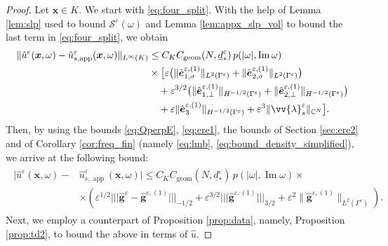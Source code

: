 \documentclass[]{article}
\numberwithin{equation}{section}
\numberwithin{theorem}{section}
\numberwithin{lemma}{section}
\numberwithin{corollary}{section}
\numberwithin{proposition}{section}
\numberwithin{definition}{section}
\newcommand{\re}{\varepsilon}
\renewcommand{\vec}{\boldsymbol}
\renewcommand{\Im}{\operatorname{Im}}
\newcommand{\trinorm}[1]{\vert\!\vert\!\vert #1 \vert\!\vert\!\vert}
\begin{document}
	\begin{proof}
		Let $\vec{x}\in K$. 
		We start with \eqref{eq:four_split}. With the help of Lemma \ref{lem:slp} used to bound $\mathcal{S}^{\re}(\omega)$ and Lemma \ref{lem:appx_slp_vol} to bound the last term in  \eqref{eq:four_split}, we obtain
		\begin{align*}%
			\|\hat{u}^{\re}(\vec{x},\omega) - \hat{u}^{\re}_{s, \operatorname{app}}(\vec{x},\omega)\|_{L^{\infty}(K)} &\leq 
			C_K C_{\operatorname{geom}}(N, \underline{d}_*^{\re}) \, p(|\omega|, \Im \omega)  \\
			&\times\big[ \re\big( \|\hat{\vec{e}}^{\re,(1)}_{1,\sigma}\|_{L^2(\Gamma^{\re})} + \|\hat{\vec{e}}^{\re,(1)}_{2,\sigma}\|_{L^2(\Gamma^{\re})} \big) \\
			&\quad + \re^{3/2} \big( \|\hat{\vec{e}}^{\re,(1)}_{1,\perp}\|_{H^{-1/2}(\Gamma^{\re})} + \|\hat{\vec{e}}^{\re,(1)}_{2,\perp}\|_{H^{-1/2}(\Gamma^{\re})} \big) \\
			&\quad + \re \|\hat{\vec{e}}^{\re,(1)}_3\|_{H^{-1/2}(\Gamma^{\re})} + \re^3 \| \vv{\lambda}^{\re}_s \|_{\mathbb{C}^N} \big].
		\end{align*}
		Then, by using  
		the bounds \eqref{eq:QperpE}, \eqref{eq:ere1}, the bounds of Section \ref{sec:ere2} and of Corollary \ref{cor:freq_fin}  (namely \eqref{eq:lmb}, \eqref{eq:bound_density_simplified}), we arrive at the following bound:
		\begin{align}
			\label{eq:bound_field_s_FD}
			\begin{split}
				|\hat{u}^{\re}(\vec{x},\omega) - &\hat{u}^{\re}_{s, \operatorname{app}}(\vec{x},\omega)| \leq 
				C_KC_{\operatorname{geom}}(N, \underline{d}_*^{\re}) \, p(|\omega|, \Im \omega) \times    \\
				&\times \left(\re^{1/2}\trinorm {\hat{\vec{g}}^{\re}-\hat{\vec{g}}^{\re,(1)}}_{-1/2}+\re^{3/2}\trinorm {\hat{\vec{g}}^{\re,(1)}}_{3/2}+\re^2\|\hat{\vec{g}}^{\re,(1)}\|_{L^2(\Gamma^{\re})}\right). %
			\end{split}
		\end{align}
		Next, we employ a counterpart of Proposition \ref{prop:data}, namely, Proposition \ref{prop:td2}, to bound the above in terms of $\hat{u}$. 
	\end{proof}
	
\end{document}
